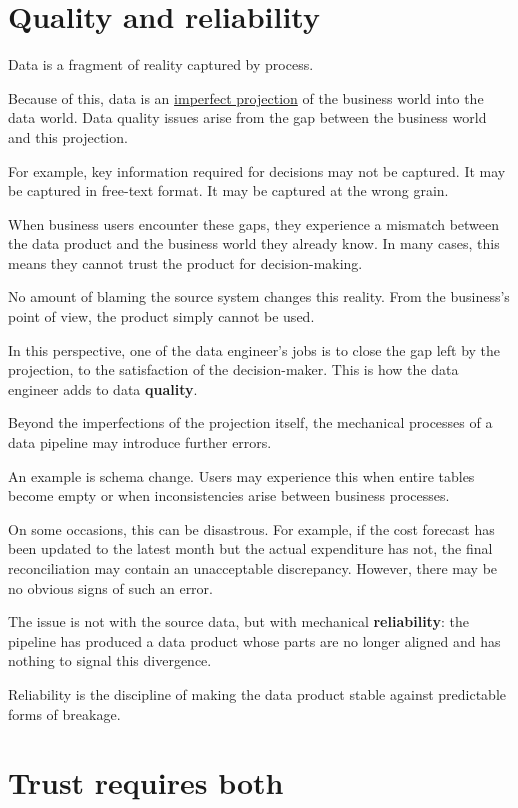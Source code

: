 \documentclass[10pt,openany,10pt]{book}
\begin{document}
\section{Quality and reliability}\label{quality-and-reliability}

Data is a fragment of reality captured by process.

Because of this, data is an
\hyperref[docs-foundations-what-is-data]{imperfect projection} of the
business world into the data world. Data quality issues arise from the
gap between the business world and this projection.

For example, key information required for decisions may not be captured.
It may be captured in free-text format. It may be captured at the wrong
grain.

When business users encounter these gaps, they experience a mismatch
between the data product and the business world they already know. In
many cases, this means they cannot trust the product for
decision-making.

No amount of blaming the source system changes this reality. From the
business's point of view, the product simply cannot be used.

In this perspective, one of the data engineer's jobs is to close the gap
left by the projection, to the satisfaction of the decision-maker. This
is how the data engineer adds to data \textbf{quality}.

Beyond the imperfections of the projection itself, the mechanical
processes of a data pipeline may introduce further errors.

An example is schema change. Users may experience this when entire
tables become empty or when inconsistencies arise between business
processes.

On some occasions, this can be disastrous. For example, if the cost
forecast has been updated to the latest month but the actual expenditure
has not, the final reconciliation may contain an unacceptable
discrepancy. However, there may be no obvious signs of such an error.

The issue is not with the source data, but with mechanical
\textbf{reliability}: the pipeline has produced a data product whose
parts are no longer aligned and has nothing to signal this divergence.

Reliability is the discipline of making the data product stable against
predictable forms of breakage.

\section{Trust requires both}\label{trust-requires-both}
\end{document}

